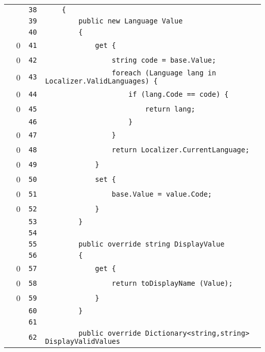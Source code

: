 \documentclass[a4paper,10pt]{article}
\begin{document}
\begin{longtable}[l]{lrrl}
\cellcolor{gray} &  & \verb~38~ & \verb~    {~\\
\cellcolor{gray} &  & \verb~39~ & \verb~        public new Language Value~\\
\cellcolor{gray} &  & \verb~40~ & \verb~        {~\\
\cellcolor{red} & 0 & \verb~41~ & \verb~            get {~\\
\cellcolor{red} & 0 & \verb~42~ & \verb~                string code = base.Value;~\\
\cellcolor{red} & 0 & \verb~43~ & \verb~                foreach (Language lang in Localizer.ValidLanguages) {~\\
\cellcolor{red} & 0 & \verb~44~ & \verb~                    if (lang.Code == code) {~\\
\cellcolor{red} & 0 & \verb~45~ & \verb~                        return lang;~\\
\cellcolor{gray} &  & \verb~46~ & \verb~                    }~\\
\cellcolor{red} & 0 & \verb~47~ & \verb~                }~\\
\cellcolor{red} & 0 & \verb~48~ & \verb~                return Localizer.CurrentLanguage;~\\
\cellcolor{red} & 0 & \verb~49~ & \verb~            }~\\
\cellcolor{red} & 0 & \verb~50~ & \verb~            set {~\\
\cellcolor{red} & 0 & \verb~51~ & \verb~                base.Value = value.Code;~\\
\cellcolor{red} & 0 & \verb~52~ & \verb~            }~\\
\cellcolor{gray} &  & \verb~53~ & \verb~        }~\\
\cellcolor{gray} &  & \verb~54~ & \verb~~\\
\cellcolor{gray} &  & \verb~55~ & \verb~        public override string DisplayValue~\\
\cellcolor{gray} &  & \verb~56~ & \verb~        {~\\
\cellcolor{red} & 0 & \verb~57~ & \verb~            get {~\\
\cellcolor{red} & 0 & \verb~58~ & \verb~                return toDisplayName (Value);~\\
\cellcolor{red} & 0 & \verb~59~ & \verb~            }~\\
\cellcolor{gray} &  & \verb~60~ & \verb~        }~\\
\cellcolor{gray} &  & \verb~61~ & \verb~~\\
\cellcolor{gray} &  & \verb~62~ & \verb~        public override Dictionary<string,string> DisplayValidValues~\\

\end{longtable}
\end{document}
